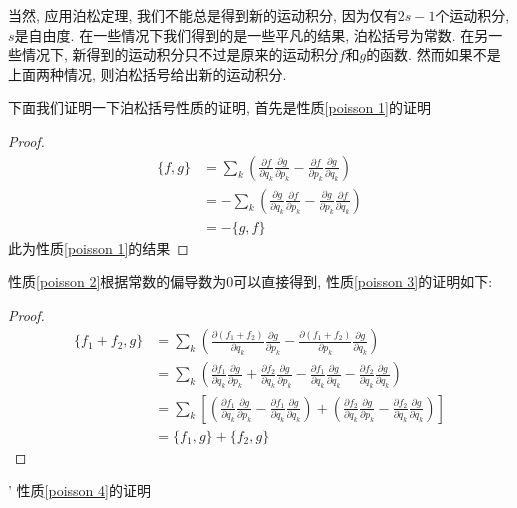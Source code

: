 \documentclass[a4paper,11pt]{article}
\newtheorem{proof}{证明}[section]
\begin{document}
当然, 应用泊松定理, 我们不能总是得到新的运动积分, 因为仅有$2s-1$个运动积分, $s$是自由度. 在一些情况下我们得到的是一些平凡的结果, 泊松括号为常数. 在另一些情况下, 新得到的运动积分只不过是原来的运动积分$f$和$g$的函数. 然而如果不是上面两种情况, 则泊松括号给出新的运动积分.

\indent 下面我们证明一下泊松括号性质的证明, 首先是性质\ref{poisson 1}的证明
\begin{proof}
\begin{equation*}
  \begin{split}
     \{f,g\}&=\sum_{k}\left(\frac{\partial f}{\partial{q_k}}\frac{\partial g}{\partial{p_k}}-\frac{\partial f}{\partial{p_k}}\frac{\partial g}{\partial{q_k}}\right) \\
       &=-\sum_{k}\left(\frac{\partial g}{\partial{q_k}}\frac{\partial f}{\partial{p_k}}-\frac{\partial g}{\partial{p_k}}\frac{\partial f}{\partial{q_k}}\right) \\
       &=-\{g,f\}
  \end{split}
\end{equation*}
此为性质\ref{poisson 1}的结果
\end{proof}
性质\ref{poisson 2}根据常数的偏导数为$0$可以直接得到, 性质\ref{poisson 3}的证明如下:
\begin{proof}
  \begin{equation*}
    \begin{split}
       \{f_1+f_2,g\}&=\sum_{k}\left(\frac{\partial{(f_1+f_2)}}{\partial{q_k}}\frac{\partial g}{\partial{p_k}}-\frac{\partial{(f_1+f_2)}}{\partial{p_k}}\frac{\partial g}{\partial{q_k}}\right) \\
         &=\sum_{k}\left(\frac{\partial f_1}{\partial{q_k}}\frac{\partial g}{\partial{p_k}}+\frac{\partial f_2}{\partial{q_k}}\frac{\partial g}{\partial{p_k}}-\frac{\partial f_1}{\partial{q_k}}\frac{\partial g}{\partial{q_k}}-\frac{\partial f_2}{\partial{q_k}}\frac{\partial g}{\partial{q_k}}\right) \\
         &=\sum_{k}\left[\left(\frac{\partial f_1}{\partial{q_k}}\frac{\partial g}{\partial{p_k}}-\frac{\partial f_1}{\partial{q_k}}\frac{\partial g}{\partial{q_k}}\right)+\left(\frac{\partial f_2}{\partial{q_k}}\frac{\partial g}{\partial{p_k}}-\frac{\partial f_2}{\partial{q_k}}\frac{\partial g}{\partial{q_k}}\right)\right] \\
         &=\{f_1,g\}+\{f_2,g\}
    \end{split}
  \end{equation*}
\end{proof}'
性质\ref{poisson 4}的证明
\end{document}
